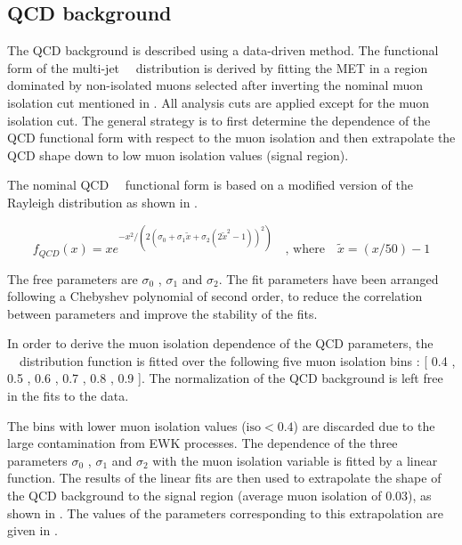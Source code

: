 \subsection{QCD background}\label{sec:WBoson_SignalExtraction_QCDBackground}


The QCD background is described using a data-driven method. The functional form of the multi-jet \ETslash\ \ distribution is derived by fitting the MET in a region dominated by non-isolated muons selected after inverting the nominal muon isolation cut mentioned in . All analysis cuts are applied except for the muon isolation cut. The general strategy is to first determine the dependence of the QCD functional form with respect to the muon isolation and then extrapolate the QCD shape down to low muon isolation values (signal region).

The nominal QCD \ETslash\ \ functional form is based on a modified version of the Rayleigh distribution as shown in .

\begin{equation}
f_{QCD}\left(x\right) = x {e}^{-{{x}^{2}}/{\left(2\left(\sigma_{0} + \sigma_{1}\tilde{x} + \sigma_{2}\left(2{\tilde{x}}^{2}-1\right)\right)^{2}\right)}} \quad \textrm{, where} \quad \tilde{x} = (x/50) - 1
\label{eq:QCD_Nominal}
\end{equation}

The free parameters are $\sigma_{0}$ ,  $\sigma_{1}$ and $\sigma_{2}$. The fit parameters have been arranged following a Chebyshev polynomial of second order, to reduce the correlation between parameters and improve the stability of the fits.

In order to derive the muon isolation dependence of the QCD parameters, the \ETslash\ \ distribution function is fitted over the following five muon isolation bins : [ 0.4 , 0.5 , 0.6 , 0.7 , 0.8 , 0.9 ]. The normalization of the QCD background is left free in the fits to the data.

The bins with lower muon isolation values ($\text{iso} < 0.4$) are discarded due to the large contamination from EWK processes. The dependence of the three parameters $\sigma_{0}$ ,  $\sigma_{1}$ and $\sigma_{2}$ with the muon isolation variable is fitted by a linear function. The results of the linear fits are then used to  extrapolate the shape of the QCD background to the signal region (average muon isolation of 0.03), as shown in . The values of the parameters corresponding to this extrapolation are given in .

